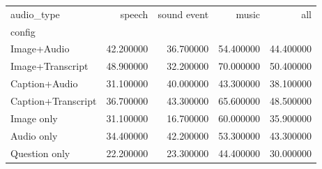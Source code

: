 \begin{tabular}{lrrrr}
\toprule
audio_type & speech & sound event & music & all \\
config &  &  &  &  \\
\midrule
Image+Audio & 42.200000 & 36.700000 & 54.400000 & 44.400000 \\
Image+Transcript & 48.900000 & 32.200000 & 70.000000 & 50.400000 \\
Caption+Audio & 31.100000 & 40.000000 & 43.300000 & 38.100000 \\
Caption+Transcript & 36.700000 & 43.300000 & 65.600000 & 48.500000 \\
Image only & 31.100000 & 16.700000 & 60.000000 & 35.900000 \\
Audio only & 34.400000 & 42.200000 & 53.300000 & 43.300000 \\
Question only & 22.200000 & 23.300000 & 44.400000 & 30.000000 \\
\bottomrule
\end{tabular}
